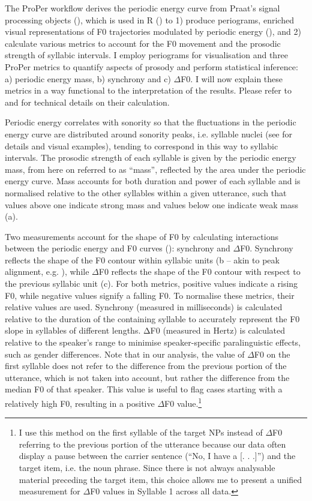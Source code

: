 The ProPer workflow derives the periodic energy curve from Praat’s signal processing objects (\citealt{BoersmaWeenink2021}), which is used in R (\citealt{R_core_team2021}) to 1) produce periograms, enriched visual representations of F0 trajectories modulated by periodic energy (\citealt{CangemiGrice2018}), and 2) calculate various metrics to account for the F0 movement and the prosodic strength of syllabic intervals. I employ periograms for visualisation and three ProPer metrics to quantify aspects of prosody and perform statistical inference: a) periodic energy mass, b) synchrony and c) ${\Delta}$F0. I will now explain these metrics in a way functional to the interpretation of the results. Please refer to \citet{SbrannaEtAl2023} and \citet{SbrannaEtAl2025} for technical details on their calculation.

Periodic energy correlates with sonority so that the fluctuations in the periodic energy curve are distributed around sonority peaks, i.e. syllable nuclei (see \citealt{CangemiGrice2018} for details and visual examples), tending to correspond in this way to syllabic intervals. The prosodic strength of each syllable is given by the periodic energy mass, from here on referred to as “mass”, reflected by the area under the periodic energy curve. Mass accounts for both duration and power of each syllable and is normalised relative to the other syllables within a given utterance, such that values above one indicate strong mass and values below one indicate weak mass (a).

Two measurements account for the shape of F0 by calculating interactions between the periodic energy and F0 curves (\citealt{AlbertGrice2019}): synchrony and ${\Delta}$F0. Synchrony reflects the shape of the F0 contour within syllabic units (b – akin to peak alignment, e.g. \citealt{LaddMennen2006}), while ${\Delta}$F0 reflects the shape of the F0 contour with respect to the previous syllabic unit (c). For both metrics, positive values indicate a rising F0, while negative values signify a falling F0. To normalise these metrics, their relative values are used. Synchrony (measured in milliseconds) is calculated relative to the duration of the containing syllable to accurately represent the F0 slope in syllables of different lengths. ΔF0 (measured in Hertz) is calculated relative to the speaker's range to minimise speaker-specific paralinguistic effects, such as gender differences. Note that in our analysis, the value of ${\Delta}$F0 on the first syllable does not refer to the difference from the previous portion of the utterance, which is not taken into account, but rather the difference from the median F0 of that speaker. This value is useful to flag cases starting with a relatively high F0, resulting in a positive ${\Delta}$F0 value.\footnote{I use this method on the first syllable of the target NPs instead of ${\Delta}$F0 referring to the previous portion of the utterance because our data often display a pause between the carrier sentence (“No, I have a [. . .]”) and the target item, i.e. the noun phrase. Since there is not always analysable material preceding the target item, this choice allows me to present a unified measurement for ${\Delta}$F0 values in Syllable 1 across all data.} 


